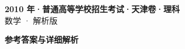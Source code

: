 \documentclass[zihao=-4, a4paper]{ctexart}
\begin{document}
\begin{center}
  {\Large\bfseries 2010 年·普通高等学校招生考试·天津卷·理科}\\[4pt]
  {\large 数学 · 解析版}
\end{center}
\medskip
{}

\clearpage
{}
\begin{center}{\Large\bfseries 参考答案与详细解析}\end{center}
\medskip

\end{document}

